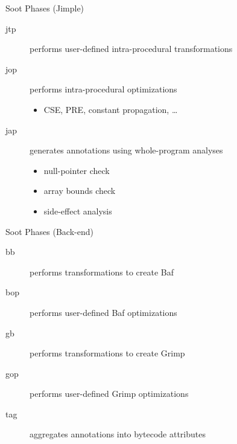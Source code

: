 \begin{slide}{Soot Phases (Jimple)}
\begin{description}
\item[jtp] performs user-defined intra-procedural transformations
\item[jop] performs intra-procedural optimizations
\begin{itemize}
\item CSE, PRE, constant propagation, \ldots
\end{itemize}
\item[jap] generates annotations using whole-program analyses
\begin{itemize}
\item null-pointer check
\item array bounds check
\item side-effect analysis
\end{itemize}
\end{description}
\end{slide}

\begin{slide}{Soot Phases (Back-end)}
\begin{description}
\item[bb] performs transformations to create Baf
\item[bop] performs user-defined Baf optimizations
\end{description}
\begin{description}
\item[gb] performs transformations to create Grimp
\item[gop] performs user-defined Grimp optimizations
\end{description}
\begin{description}
\item[tag] aggregates annotations into bytecode attributes
\end{description}
\end{slide}



